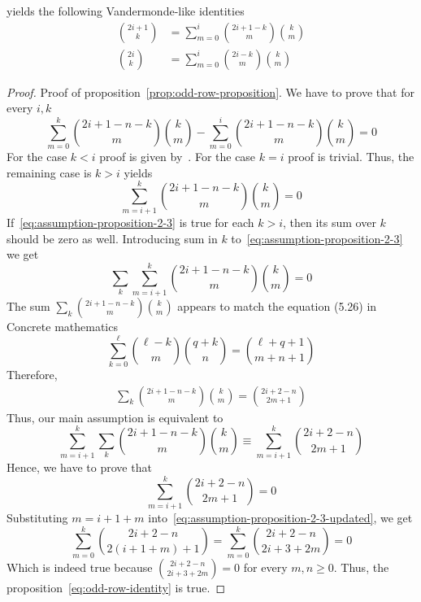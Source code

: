 yields the following Vandermonde-like identities
\begin{align*}
    \binom{2i+1}{k} &= \sum_{m=0}^{i} \binom{2i+1-k}{m} \binom{k}{m} \\
    \binom{2i}{k}   &= \sum_{m=0}^{i} \binom{2i-k}{m} \binom{k}{m}
\end{align*}
\begin{proof}
    Proof of proposition~\eqref{prop:odd-row-proposition}.
    We have to prove that for every $i,k$
    \begin{equation*}
        \sum_{m=0}^{k} \binom{2i+1-n-k}{m} \binom{k}{m} - \sum_{m=0}^{i} \binom{2i+1-n-k}{m} \binom{k}{m} = 0
    \end{equation*}
    For the case $k<i$ proof is given by~\cite[proposition 6.0.1]{gregory2023iterated}.
    For the case $k=i$ proof is trivial.
    Thus, the remaining case is $k>i$ yields
    \begin{equation}
        \sum_{m=i+1}^{k} \binom{2i+1-n-k}{m} \binom{k}{m} = 0
        \label{eq:assumption-proposition-2-3}
    \end{equation}
    If~\eqref{eq:assumption-proposition-2-3} is true for each $k>i$, then its sum over $k$ should be zero as well.
    Introducing sum in $k$ to~\eqref{eq:assumption-proposition-2-3} we get
    \begin{equation*}
        \sum_{k} \sum_{m=i+1}^{k} \binom{2i+1-n-k}{m} \binom{k}{m} = 0
    \end{equation*}
    The sum $\sum_{k} \binom{2i+1-n-k}{m} \binom{k}{m}$ appears to match the equation (5.26) in
    Concrete mathematics~\cite[eq. 5.26]{graham1994concrete}
    \begin{equation}
        \sum_{k=0}^{\ell} \binom{\ell-k}{m} \binom{q+k}{n} = \binom{\ell+q+1}{m+n+1}
        \label{eq:concrete-mathematics-5-26}
    \end{equation}
    Therefore,
    \begin{align*}
        \sum_{k} \binom{2i+1-n-k}{m} \binom{k}{m} = \binom{2i+2-n}{2m+1}
    \end{align*}
    Thus, our main assumption is equivalent to
    \begin{equation*}
        \sum_{m=i+1}^{k} \sum_{k} \binom{2i+1-n-k}{m} \binom{k}{m} \equiv \sum_{m=i+1}^{k} \binom{2i+2-n}{2m+1}
    \end{equation*}
    Hence, we have to prove that
    \begin{equation}
        \sum_{m=i+1}^{k} \binom{2i+2-n}{2m+1} = 0\label{eq:assumption-proposition-2-3-updated}
    \end{equation}
    Substituting $m=i+1+m$ into~\eqref{eq:assumption-proposition-2-3-updated}, we get
    \begin{equation*}
        \sum_{m=0}^{k} \binom{2i+2-n}{2(i+1+m)+1} = \sum_{m=0}^{k} \binom{2i+2-n}{2i+3+2m} = 0
    \end{equation*}
    Which is indeed true because $\binom{2i+2-n}{2i+3+2m}=0$ for every $m,n \geq 0$.
    Thus, the proposition~\eqref{eq:odd-row-identity} is true.
\end{proof}

